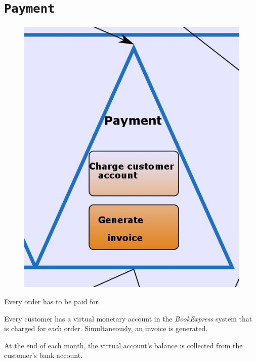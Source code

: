 \section{\texttt{Payment}}
\begin{figure}
\centering
\includegraphics[scale=0.30]{./screenshots/Payment.jpeg}
\vspace{-20pt}
\end{figure}

Every order has to be paid for.

Every customer has a virtual monetary account in the \emph{BookExpress} system that is charged for each order. Simultaneously, an invoice
is generated.

At the end of each month, the virtual account's balance is collected from the customer's bank account.



